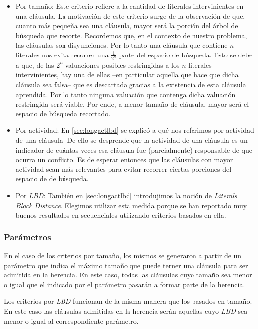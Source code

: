 \begin{itemize}
	\item Por tamaño: Este criterio refiere a la cantidad de literales intervinientes en una cláusula. La motivación de este criterio surge de la observación de que, cuanto más pequeña sea una cláusula, mayor será la porción del árbol de búsqueda que recorte. Recordemos que, en el contexto de nuestro problema, las cláusulas son disyunciones. Por lo tanto una cláusula que contiene $n$ literales nos evita recorrer una $\frac{1}{2^n}$ parte del espacio de búsqueda. Esto se debe a que, de las $2^n$ valuaciones posibles restringidas a los $n$ literales intervinientes, hay una de ellas --en particular aquella que hace que dicha cláusula sea falsa-- que es descartada gracias a la existencia de esta cláusula aprendida. Por lo tanto ninguna valuación que contenga dicha valuación restringida será viable. Por ende, a menor tamaño de cláusula, mayor será el espacio de búsqueda recortado.

	\item Por actividad: En \ref{sec:longactlbd} se explicó a qué nos referimos por actividad de una cláusula. De ello se desprende que la actividad de una cláusula es un indicador de cuántas veces esa cláusula fue (parcialmente) responsable de que ocurra un conflicto. Es de esperar entonces que las cláusulas con mayor actividad sean más relevantes para evitar recorrer ciertas porciones del espacio de de búsqueda.

	\item Por \emph{LBD}: También en \ref{sec:longactlbd} introdujimos la noción de \emph{Literals Block Distance}. Elegimos utilizar esta medida porque se han reportado muy buenos resultados en \ssolvers secuenciales \cite{satchallenge12,satcomp11,satcomp09} utilizando criterios basados en ella.
\end{itemize}

\subsubsection{Parámetros}

En el caso de los criterios por tamaño, los mismos se generaron a partir de un
parámetro que indica el máximo tamaño que puede terner una cláusula para ser
admitida en la herencia. En este caso, todas las cláusulas cuyo tamaño sea
menor o igual que el indicado por el parámetro pasarán a formar parte de la
herencia.

Los criterios por \emph{LBD} funcionan de la misma manera que los basados en
tamaño. En este caso las cláusulas admitidas en la herencia serán aquellas
cuyo \emph{LBD} sea menor o igual al correspondiente parámetro.

